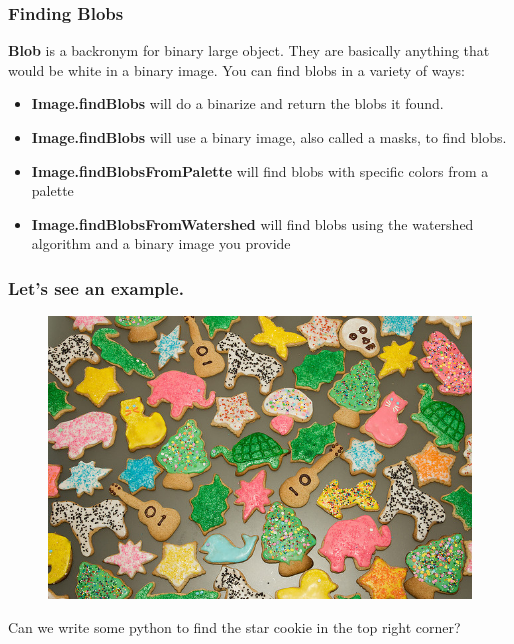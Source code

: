 \documentclass{beamer}
\begin{document}
\begin{frame}
  \frametitle{Finding Blobs}

\textbf{Blob} is a backronym for binary large object. They are
basically anything that would be white in a binary image. You can find
blobs in a variety of ways:
\begin{itemize}
\item \textbf{Image.findBlobs} will do a binarize and return the blobs
  it found.
\item \textbf{Image.findBlobs} will use a binary image, also called a
  masks, to find blobs.
\item \textbf{Image.findBlobsFromPalette} will find blobs with
  specific colors from a palette
\item \textbf{Image.findBlobsFromWatershed} will find blobs using the
  watershed algorithm and a binary image you provide
\end{itemize}
\end{frame}
\begin{frame}
  \frametitle{Let's see an example.}
 \begin{figure}
     \includegraphics[width=0.7\linewidth]{cookies.jpg}
 \end{figure}
Can we write some python to find the star cookie in the top right corner?
\end{frame}
\end{document}

